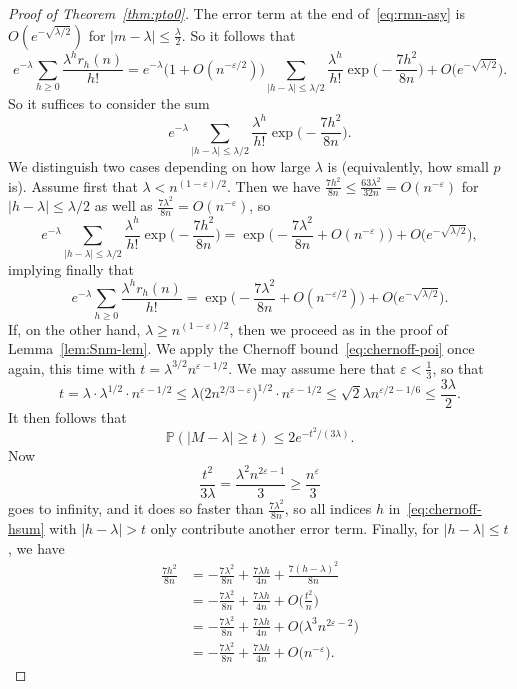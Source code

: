 \documentclass[a4paper,12pt,reqno]{amsart}
\theoremstyle{remark}
\newcommand{\IP}{\mathbb{P}}
\newcommand{\gep}{\varepsilon}
\newcommand{\gl}{\lambda}
\begin{document}
\begin{proof}[Proof of Theorem~\ref{thm:pto0}]
The error term at the end of~\eqref{eq:rmn-asy} is $O(e^{-\sqrt{\gl/2}})$ for $|m -\gl| \leq \frac{\gl}{2}$. So it follows that
\[e^{-\gl} \sum_{h \geq 0} \frac{\gl^h r_h(n)}{h!} =
e^{-\gl} \Big( 1 + O(n^{-\gep/2}) \Big) \sum_{|h-\gl| \leq \gl/2} \frac{\gl^h}{h!} \exp \Big( {-}\frac{7h^2}{8n} \Big) + O\big(e^{-\sqrt{\gl/2}}\big).\]
So it suffices to consider the sum
\begin{equation}\label{eq:chernoff-hsum}
 e^{-\gl} \sum_{|h-\gl| \leq \gl/2} \frac{\gl^h}{h!} \exp \Big( {-}\frac{7h^2}{8n} \Big).
\end{equation}
We distinguish two cases depending on how large $\gl$ is (equivalently, how small $p$ is).
Assume first that $\gl < n^{(1-\gep)/2}$. Then we have $\frac{7h^2}{8n} \leq \frac{63\gl^2}{32n} = O(n^{-\gep})$ for $|h-\gl| \leq \gl/2$ as well as
$\frac{7\gl^2}{8n} = O(n^{-\gep})$, so
\[e^{-\gl} \sum_{|h-\gl| \leq \gl/2} \frac{\gl^h}{h!} \exp \Big( {-}\frac{7h^2}{8n} \Big) = \exp \Big( {-}\frac{7\gl^2}{8n} + O(n^{-\gep}) \Big) + O\big(e^{-\sqrt{\gl/2}}\big),\]
implying finally that
\begin{equation}\label{eq:sum-asy}
e^{-\gl} \sum_{h \geq 0} \frac{\gl^h r_h(n)}{h!} =  \exp \Big( {-}\frac{7\gl^2}{8n} + O(n^{-\gep/2}) \Big) + O\big(e^{-\sqrt{\gl/2}}\big).
\end{equation}
If, on the other hand, $\gl \geq n^{(1-\gep)/2}$, then
we proceed as in the proof of Lemma~\ref{lem:Snm-lem}. We apply the Chernoff bound~\eqref{eq:chernoff-poi} once again, this time with $t = \gl^{3/2}n^{\gep-1/2}$. We may assume here that $\gep < \frac13$, so that
\[t = \gl \cdot \gl^{1/2} \cdot n^{\gep - 1/2} \leq \gl \big(2n^{2/3-\gep}\big)^{1/2} \cdot n^{\gep - 1/2} \leq \sqrt{2} \gl n^{\gep/2 - 1/6} \leq \frac{3\gl}{2}.\]
It then follows that
\[\IP(|M-\gl|\geq t) \leq 2 e^{-t^2/(3\gl)}.\]
Now
\[\frac{t^2}{3\gl} = \frac{\gl^2 n^{2\gep-1}}{3} \geq \frac{n^{\gep}}{3}\]
goes to infinity, and it does so faster than $\frac{7\gl^2}{8n}$, so all indices $h$ in~\eqref{eq:chernoff-hsum} with $|h-\gl| > t$ only contribute another error term. Finally, for $|h-\gl| \leq t$, we have
\begin{align*}
\frac{7h^2}{8n} &= - \frac{7\gl^2}{8n} + \frac{7\gl h}{4n} + \frac{7(h-\gl)^2}{8n} \\
&= - \frac{7\gl^2}{8n} + \frac{7\gl h}{4n} + O \Big( \frac{t^2}{n} \Big) \\
&= - \frac{7\gl^2}{8n} + \frac{7\gl h}{4n} + O \Big( \gl^3 n^{2\gep-2} \Big) \\
&= - \frac{7\gl^2}{8n} + \frac{7\gl h}{4n} + O \big( n^{-\gep} \big).

\end{align*}
\end{proof}
\end{document}
